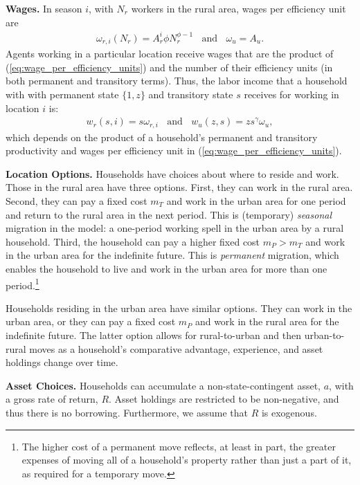 \documentclass[12pt,pdftex]{article}
\begin{document}
\textbf{Wages.} In season $i$, with $N_r$ workers in the rural area, wages per efficiency unit are
\begin{align}
\omega_{r,i}(N_r) = A^{i}_{r} \phi N_r^{\phi-1}  \ \ \ \  \mbox{and} \ \ \ \ \omega_u = A_u.
\label{eq:wage_per_efficiency_units}
\end{align}
Agents working in a particular location receive wages that are the product of (\ref{eq:wage_per_efficiency_units}) and the number of their efficiency units (in both permanent and transitory terms). Thus, the labor income that a household with with permanent state $\{1, z\}$ and transitory state $s$ receives for working in location $i$ is:
\begin{align}
w_{r}(s, i) = s \omega_{r,i} \ \ \ \ \mbox{and} \ \ \ \ w_{u}(z, s) = z s^\gamma \omega_u,
\label{eq:wages}
\end{align}
which depends on the product of a household's permanent and transitory productivity and wages per efficiency unit in (\ref{eq:wage_per_efficiency_units}).

\textbf{Location Options.} Households have choices about where to reside and work. Those in the rural area have three options. First, they can work in the rural area. Second, they can pay a fixed cost $m_T$ and work in the urban area for one period and return to the rural area in the next period. This is (temporary) \emph{seasonal} migration in the model: a one-period working spell in the urban area by a rural household. Third, the household can pay a higher fixed cost $m_P > m_T$ and work in the urban area for the indefinite future. This is \emph{permanent} migration, which enables the household to live and work in the urban area for more than one period.\footnote{The higher cost of a permanent move reflects, at least in part, the greater expenses of moving all of a household's property rather than just a part of it, as required for a temporary move.}

Households residing in the urban area have similar options. They can work in the urban area, or they can pay a fixed cost $m_P$ and work in the rural area for the indefinite future. The latter option allows for rural-to-urban and then urban-to-rural moves as a household's comparative advantage, experience, and asset holdings change over time.

\textbf{Asset Choices.} Households can accumulate a non-state-contingent asset, $a$, with a gross rate of return, $R$. Asset holdings are restricted to be non-negative, and thus there is no borrowing. Furthermore, we assume that $R$ is exogenous.
\end{document}

